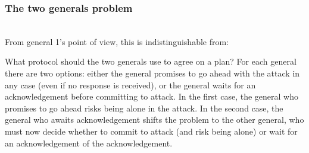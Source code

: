 \begin{frame}
    \label{s:two-generals-comms}
    \frametitle{The two generals problem}
    \begin{center}
        \pause\\[1em]
        From general 1's point of view, this is indistinguishable from:\\[1em]
    \end{center}
\end{frame}

What protocol should the two generals use to agree on a plan?
For each general there are two options: either the general promises to go ahead with the attack in any case (even if no response is received), or the general waits for an acknowledgement before committing to attack.
In the first case, the general who promises to go ahead risks being alone in the attack.
In the second case, the general who awaits acknowledgement shifts the problem to the other general, who must now decide whether to commit to attack (and risk being alone) or wait for an acknowledgement of the acknowledgement.


